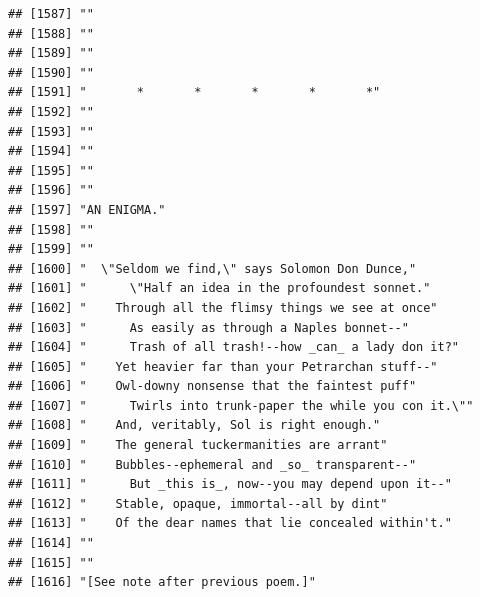 \documentclass{article}\usepackage[]{graphicx}\usepackage[]{color}
\makeatletter
\newenvironment{kframe}{%
 \def\at@end@of@kframe{}%
 \ifinner\ifhmode%
  \def\at@end@of@kframe{\end{minipage}}%
  \begin{minipage}{\columnwidth}%
 \fi\fi%
 \def\FrameCommand##1{\hskip\@totalleftmargin \hskip-\fboxsep
 \colorbox{shadecolor}{##1}\hskip-\fboxsep
     \hskip-\linewidth \hskip-\@totalleftmargin \hskip\columnwidth}%
 \MakeFramed {\advance\hsize-\width
   \@totalleftmargin\z@ \linewidth\hsize
   \@setminipage}}%
 {\par\unskip\endMakeFramed%
 \at@end@of@kframe}
\newenvironment{knitrout}{}{} %
\makeatother
\begin{document}
\begin{knitrout}
\begin{kframe}
\begin{verbatim}
## [1587] ""                                                                            
## [1588] ""                                                                            
## [1589] ""                                                                            
## [1590] ""                                                                            
## [1591] "       *       *       *       *       *"                                    
## [1592] ""                                                                            
## [1593] ""                                                                            
## [1594] ""                                                                            
## [1595] ""                                                                            
## [1596] ""                                                                            
## [1597] "AN ENIGMA."                                                                  
## [1598] ""                                                                            
## [1599] ""                                                                            
## [1600] "  \"Seldom we find,\" says Solomon Don Dunce,"                               
## [1601] "      \"Half an idea in the profoundest sonnet."                             
## [1602] "    Through all the flimsy things we see at once"                            
## [1603] "      As easily as through a Naples bonnet--"                                
## [1604] "      Trash of all trash!--how _can_ a lady don it?"                         
## [1605] "    Yet heavier far than your Petrarchan stuff--"                            
## [1606] "    Owl-downy nonsense that the faintest puff"                               
## [1607] "      Twirls into trunk-paper the while you con it.\""                       
## [1608] "    And, veritably, Sol is right enough."                                    
## [1609] "    The general tuckermanities are arrant"                                   
## [1610] "    Bubbles--ephemeral and _so_ transparent--"                               
## [1611] "      But _this is_, now--you may depend upon it--"                          
## [1612] "    Stable, opaque, immortal--all by dint"                                   
## [1613] "    Of the dear names that lie concealed within't."                          
## [1614] ""                                                                            
## [1615] ""                                                                            
## [1616] "[See note after previous poem.]"                                             

\end{verbatim}
\end{kframe}
\end{knitrout}
\end{document}
